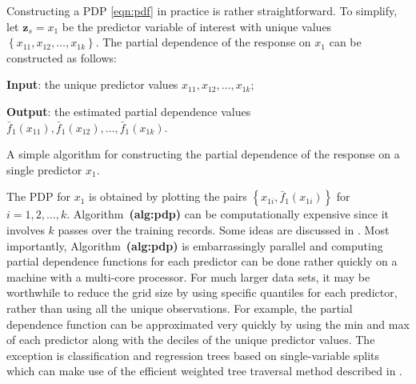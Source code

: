 \documentclass[12pt]{article}
\def\ref#1{\textbf{(#1)}}
\begin{document}
Constructing a PDP \eqref{eqn:pdf} in practice is rather straightforward. To simplify, let $\boldsymbol{z}_s = x_1$ be the predictor variable of interest with unique values $\left\{x_{11}, x_{12}, \dots, x_{1k}\right\}$. The partial dependence of the response on $x_1$ can be constructed as follows:
\begin{algorithm}
  \textbf{Input}: the unique predictor values $x_{11}, x_{12}, \dots, x_{1k}$;

  \textbf{Output}: the estimated partial dependence values $\bar{f}_1\left(x_{11}\right), \bar{f}_1\left(x_{12}\right), \dots, \bar{f}_1\left(x_{1k}\right)$. \BlankLine
    \BlankLine
    \BlankLine
  \caption{A simple algorithm for constructing the partial dependence of the response on a single predictor $x_1$. \label{alg:pdp}}
\end{algorithm}

The PDP for $x_1$ is obtained by plotting the pairs $\left\{x_{1i}, \bar{f}_1\left(x_{1i}\right)\right\}$ for $i = 1, 2, \dotsc, k$. Algorithm~\ref{alg:pdp} can be computationally expensive since it involves $k$ passes over the training records. Some ideas are discussed in \citet{pdp-greenwell-2017}. Most importantly, Algorithm~\ref{alg:pdp} is embarrassingly parallel and computing partial dependence functions for each predictor can be done rather quickly on a machine with a multi-core processor. For much larger data sets, it may be worthwhile to reduce the grid size by using specific quantiles for each predictor, rather than using all the unique observations. For example, the partial dependence function can be approximated very quickly by using the min and max of each predictor along with the deciles of the unique predictor values. The exception is classification and regression trees based on single-variable splits which can make use of the efficient weighted tree traversal method described in \citet{friedman-2001-greedy}.
\end{document}
